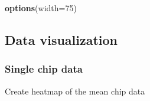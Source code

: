 \documentclass[]{article}
\newenvironment{Shaded}{\begin{snugshade}}{\end{snugshade}}
\newcommand{\KeywordTok}[1]{\textcolor[rgb]{0.13,0.29,0.53}{\textbf{{#1}}}}
\newcommand{\DataTypeTok}[1]{\textcolor[rgb]{0.13,0.29,0.53}{{#1}}}
\newcommand{\DecValTok}[1]{\textcolor[rgb]{0.00,0.00,0.81}{{#1}}}
\newcommand{\NormalTok}[1]{{#1}}
\begin{document}
\begin{Shaded}
\begin{Highlighting}[]
\KeywordTok{options}\NormalTok{(}\DataTypeTok{width=}\DecValTok{75}\NormalTok{)}
\end{Highlighting}
\end{Shaded}

\normalsize

\subsection{Data visualization}\label{data-visualization}

\subsubsection{Single chip data}\label{single-chip-data}

Create heatmap of the mean chip data
\end{document}
